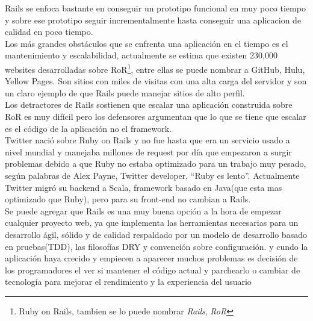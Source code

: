     Rails se enfoca bastante en conseguir un prototipo funcional en muy poco tiempo 
    y sobre ese prototipo seguir incrementalmente hasta conseguir una aplicacion 
    de calidad en poco tiempo.\\

    Los más grandes obstáculos que se enfrenta una aplicación en el tiempo es el 
    mantenimiento y escalabilidad, actualmente se estima que existen 230,000 websites\cite{web2} 
    desarrolladas sobre RoR\footnote{Ruby on Rails, tambien se lo puede nombrar \emph{Rails}, \emph{RoR}}, 
    entre ellas se puede nombrar a GitHub, Hulu, Yellow Pages. Son sitios con miles de visitas
    con una alta carga del servidor y son un claro ejemplo de que Rails puede manejar sitios de alto perfil.\\

    Los detractores de Rails sostienen que escalar una aplicación construida 
    sobre RoR es muy difícil pero los defensores argumentan que lo que se 
    tiene que escalar es el código de la aplicación no el framework.\\

    Twitter nació sobre Ruby on  Rails  y no fue hasta que era un servicio usado 
    a nivel mundial y manejaba millones de request por día que empezaron a surgir 
    problemas debido a que Ruby no estaba optimizado para un trabajo muy pesado, 
    según palabras de Alex Payne, Twitter developer, “Ruby es lento”\cite{web3}. 
    Actualmente Twitter migró su backend a Scala, framework basado en Java(que esta mas optimizado que Ruby),
    pero para su front-end no cambian a Rails.\cite{web4}\\
    
    Se puede agregar que Rails es una muy buena opción a la hora de empezar 
    cualquier proyecto web, ya que implementa las herramientas necesarias 
    para un desarrollo ágil, sólido y de calidad respaldado por un modelo 
    de desarrollo basado en pruebas(TDD), las filosofías DRY y convención sobre configuración.
    y cundo la aplicaci\'on haya crecido y empiecen a aparecer muchos problemas es 
    decisión de los programadores el ver si mantener el código actual y parchearlo o 
    cambiar de tecnología para mejorar el rendimiento y la experiencia del usuario\\

